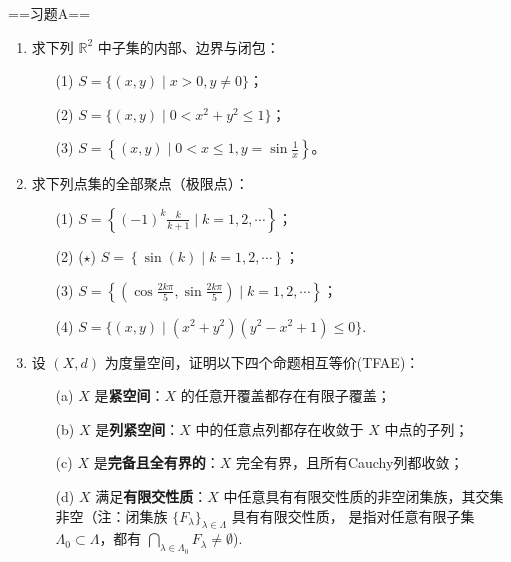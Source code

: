 \newcommand{\dis}{\displaystyle}

==习题A==
\begin{enumerate}     
    \item 求下列 $\mathbb{R}^2$ 中子集的内部、边界与闭包：
    \begin{enumerate}
        \item[(1)] $S = \{(x,y) \mid x > 0, y \neq 0\}$；
        \item[(2)] $S = \{(x,y) \mid 0 < x^2 + y^2 \leq 1\}$；
        \item[(3)] $S = \left\{(x,y) \mid 0 < x \leq 1, y = \dis\sin\frac{1}{x}\right\}$。
    \end{enumerate}
    
    \item 求下列点集的全部聚点（极限点）：
    \begin{enumerate}
        \item[(1)] $S =\dis \left\{(-1)^k \frac{k}{k+1} \mid k = 1,2,\cdots\right\}$；
        \item[(2)] ($\star$) $S = \left\{\sin(k) \mid k = 1,2,\cdots\right\}$；
        \item[(3)] $S =\dis \left\{\left(\cos\frac{2k\pi}{5}, \sin\frac{2k\pi}{5}\right) \mid k = 1,2,\cdots\right\}$；
        \item[(4)] $S = \{(x,y) \mid (x^2 + y^2)(y^2 - x^2 + 1) \leq 0\}$.
    \end{enumerate}

    \item 设 $(X,d)$ 为度量空间，证明以下四个命题相互等价(TFAE)：
    \begin{enumerate}
    \item[(a)] $X$ 是\textbf{紧空间}：$X$ 的任意开覆盖都存在有限子覆盖；
    \item[(b)] $X$ 是\textbf{列紧空间}：$X$ 中的任意点列都存在收敛于 $X$ 中点的子列；
    \item[(c)] $X$ 是\textbf{完备且全有界的}：$X$ 完全有界，且所有Cauchy列都收敛；
    \item[(d)] $X$ 满足\textbf{有限交性质}：$X$ 中任意具有有限交性质的非空闭集族，其交集非空（注：闭集族 $\dis\{F_\lambda\}_{\lambda\in\Lambda}$ 具有有限交性质，
    是指对任意有限子集 $\dis\Lambda_0\subset\Lambda$，都有 $\dis\bigcap_{\lambda\in\Lambda_0}F_\lambda\neq\emptyset$).
    \end{enumerate}
    \end{enumerate}

